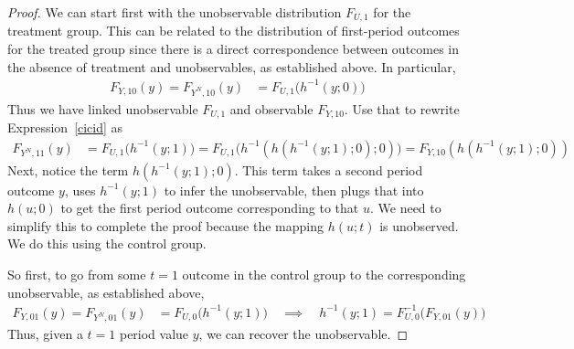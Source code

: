 \documentclass[12pt]{article}
\theoremstyle{plain}
\theoremstyle{definition}
\theoremstyle{remark}
\begin{document}
\begin{itemize}
\begin{proof}
    We can start first with the unobservable distribution $F_{U,1}$ for
    the treatment group.
    This can be related to the distribution of first-period outcomes for
    the treated group since there is a direct correspondence between
    outcomes in the absence of treatment and unobservables, as
    established above.
    In particular,
    \begin{align}
      F_{Y,10}(y)
      =
      F_{Y^N,10}(y)
      &=
      F_{U,1}\big(h^{-1}(y;0)\big)
      \label{cicid2}
    \end{align}
    Thus we have linked unobservable $F_{U,1}$ and
    observable $F_{Y,10}$.
    Use that to rewrite Expression~\ref{cicid} as
    \begin{align*}
      F_{Y^N,11}(y)
      &=
      F_{U,1}\big(h^{-1}(y;1)\big)
      =
      F_{U,1}\big(h^{-1}(h(h^{-1}(y;1);0);0)\big)
      =
      F_{Y,10}(h(h^{-1}(y;1);0))
    \end{align*}
    Next, notice the term $h(h^{-1}(y;1);0)$.
    This term takes a second period outcome $y$, uses $h^{-1}(y;1)$ to
    infer the unobservable, then plugs that into $h(u;0)$ to get the
    first period outcome corresponding to that $u$.
    We need to simplify this to complete the proof because the mapping
    $h(u;t)$ is unobserved.
    We do this using the control group.

    So first, to go from some $t=1$ outcome in the control group to the
    corresponding unobservable, as established above,
    \begin{align*}
      F_{Y,01}(y)
      =
      F_{Y^N,01}(y)
      &=
      F_{U,0}\big(h^{-1}(y;1)\big)
      \quad\implies\quad
      h^{-1}(y;1)
      =
      F_{U,0}^{-1}
      \big(
      F_{Y,01}(y)
      \big)
    \end{align*}
    Thus, given a $t=1$ period value $y$, we can recover the
    unobservable.


\end{proof}
\end{itemize}
\end{document}
